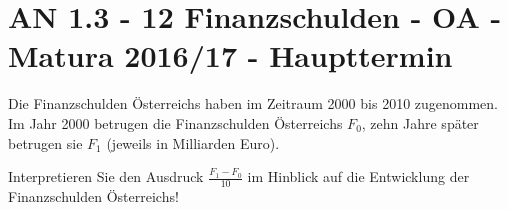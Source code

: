 \section{AN 1.3 - 12 Finanzschulden - OA - Matura 2016/17 - Haupttermin}

\begin{beispiel}[AN 1.3]{1} %
Die Finanzschulden Österreichs haben im Zeitraum 2000 bis 2010 zugenommen. Im Jahr 2000
betrugen die Finanzschulden Österreichs $F_0$, zehn Jahre später betrugen sie $F_1$ (jeweils in Milliarden Euro). \leer

Interpretieren Sie den Ausdruck $\frac{F_1-F_0}{10}$ im Hinblick auf die Entwicklung der Finanzschulden Österreichs!

\end{beispiel}
